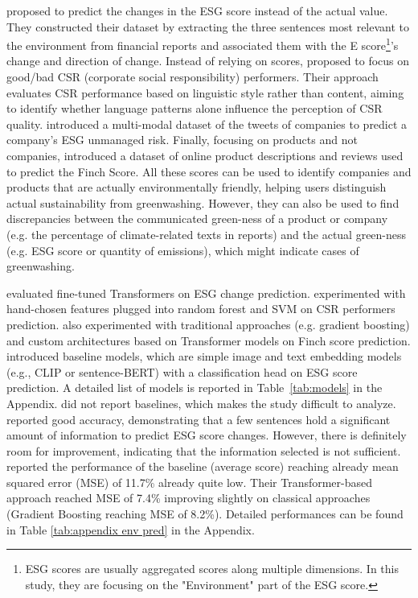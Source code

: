 \datasets \citet{Mehra_2022} proposed to predict the changes in the ESG score instead of the actual value. They constructed their dataset by extracting the three sentences most relevant to the environment from financial reports and associated them with the E score\footnote{ESG scores are usually aggregated scores along multiple dimensions. In this study, they are focusing on the "Environment" part of the ESG score.}'s change and direction of change. Instead of relying on scores, \citet{clarkson_nlp_us_csr} proposed to focus on good/bad CSR (corporate social responsibility) performers. Their approach evaluates CSR performance based on linguistic style rather than content, aiming to identify whether language patterns alone influence the perception of CSR quality. \citet{Greenscreen} introduced a multi-modal dataset of the tweets of companies to predict a company's ESG unmanaged risk. 
Finally, focusing on products and not companies, \citet{linSUSTAINABLESIGNALSijcai2023} introduced a dataset of online product descriptions and reviews used to predict the Finch Score. All these scores can be used to identify companies and products that are actually environmentally friendly, helping users distinguish actual sustainability from greenwashing. However, they can also be used to find discrepancies between the communicated green-ness of a product or company (e.g. the percentage of climate-related texts in reports) and the actual green-ness (e.g. ESG score or quantity of emissions), which might indicate cases of greenwashing.  

\solutions \citet{Mehra_2022} evaluated fine-tuned Transformers on ESG change prediction. \citet{clarkson_nlp_us_csr} experimented with hand-chosen features plugged into random forest and SVM on CSR performers prediction. \citet{linSUSTAINABLESIGNALSijcai2023} also experimented with traditional approaches (e.g. gradient boosting) and custom architectures based on Transformer models on Finch score prediction. \citet{Greenscreen} introduced baseline models, which are simple image and text embedding models (e.g., CLIP or sentence-BERT) with a classification head on ESG score prediction. A detailed list of models is reported in Table~\ref{tab:models} in the Appendix. \citet{bronzini_glitter_2023, clarkson_nlp_us_csr, Greenscreen} did not report baselines, which makes the study difficult to analyze. \cite{Mehra_2022} reported good accuracy, demonstrating that a few sentences hold a significant amount of information to predict ESG score changes. However, there is definitely room for improvement, indicating that the information selected is not sufficient. \citet{lin-etal-2023-linear} reported the performance of the baseline (average score) reaching already mean squared error (MSE) of 11.7\% already quite low. Their Transformer-based approach reached MSE of 7.4\% improving slightly on classical approaches (Gradient Boosting reaching MSE of 8.2\%). Detailed performances can be found in Table \ref{tab:appendix env pred} in the Appendix.

